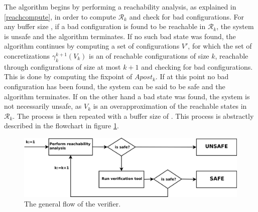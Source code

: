 The algorithm begins by performing a reachability analysis, as explained in \ref{reachcompute}, in order to compute $\mathcal{R}_k$ and check for bad configurations. For any buffer size , if a bad configuration is found to be reachable in $\mathcal{R}_k$, the system is unsafe and the algorithm terminates. If no such bad state was found, the algorithm continues by computing a set of configurations $V'$, for which the set of concretizations $\gamma_k^{k+1}(V_k)$ is an  of reachable configurations of size $k$, reachable through configurations of size at most $k+1$ and checking for bad configurations. This is done by computing the fixpoint of $Apost_k$. If at this point no bad configuration has been found, the system can be said to be safe and the algorithm terminates. If on the other hand a bad state was found, the system is not necessarily unsafe, as $V_k$ is an overapproximation of the reachable states in $\mathcal{R}_k$. The process is then repeated with a buffer size of . This process is abstractly described in the flowchart in figure \ref{flow}.

\begin{figure}
\includegraphics[width=400pt] {bilder/flowchart.png}
\caption{The general flow of the verifier.}
\label{flow}
\end{figure}
